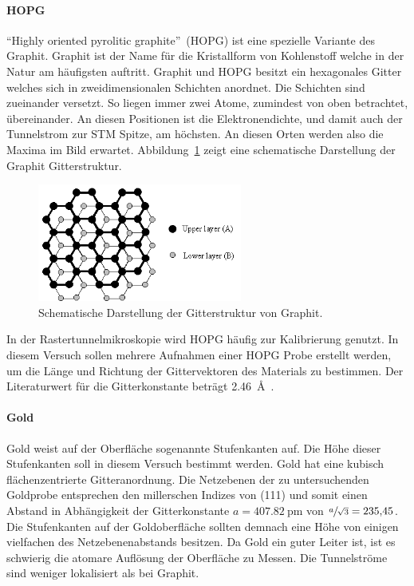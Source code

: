 \paragraph{HOPG}
\enquote{Highly oriented pyrolitic graphite}~(HOPG) ist eine spezielle Variante des Graphit.
Graphit ist der Name für die Kristallform von Kohlenstoff welche in der Natur am häufigsten auftritt. Graphit und HOPG besitzt ein hexagonales Gitter  welches sich in zweidimensionalen
Schichten anordnet. Die Schichten sind zueinander versetzt. So liegen immer zwei Atome, zumindest von oben betrachtet,  übereinander. An diesen
Positionen ist die Elektronendichte, und damit auch der Tunnelstrom zur STM Spitze, am höchsten. An diesen Orten werden also die Maxima im Bild erwartet.
Abbildung~\ref{fig:hopg_structure} zeigt eine schematische Darstellung der Graphit Gitterstruktur.
\begin{figure}
  \centering
  \includegraphics[width=0.6\textwidth]{images/hopg_structure.png}
  \caption{Schematische Darstellung der Gitterstruktur von Graphit.\cite{hopg_structure}}
  \label{fig:hopg_structure}
\end{figure}
In der Rastertunnelmikroskopie wird HOPG häufig zur Kalibrierung genutzt.
In diesem Versuch sollen mehrere Aufnahmen einer HOPG Probe erstellt werden,
um die Länge und Richtung der Gittervektoren des Materials zu bestimmen.
Der Literaturwert für die Gitterkonstante beträgt \SI{2.46}{\angstrom}~\cite{stm1}.

\paragraph{Gold}
Gold weist auf der Oberfläche sogenannte Stufenkanten auf. Die Höhe dieser Stufenkanten soll in diesem Versuch bestimmt werden.
Gold hat eine kubisch flächenzentrierte Gitteranordnung. Die Netzebenen der zu untersuchenden Goldprobe entsprechen den millerschen Indizes von  (111)
und somit einen Abstand in Abhängigkeit der Gitterkonstante $a=\SI{407.82}{\pico\meter}$ von $\sfrac{a}{\sqrt{3}} = \num{235.45}$.
Die Stufenkanten auf der Goldoberfläche sollten demnach eine Höhe von einigen vielfachen des Netzebenenabstands besitzen.
Da Gold ein guter Leiter ist, ist es schwierig die atomare Auflösung der Oberfläche zu Messen. Die Tunnelströme sind weniger lokalisiert
als bei Graphit.
